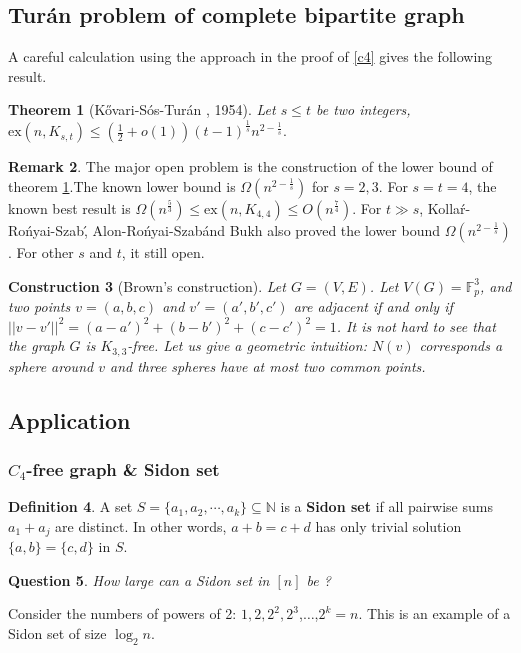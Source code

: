 \documentclass{article}
\newtheorem{theorem}{Theorem}[section]
\newtheorem{question}[theorem]{Question}
\newtheorem{construction}[theorem]{Construction}
\theoremstyle{definition}
\newtheorem{remark}[theorem]{Remark}
\newtheorem{definition}[theorem]{Definition}
\newcommand{\ex}{\mathrm{ex}}
\def\Turan{Tur\'an}
\begin{document}
\subsection{\Turan{} problem of complete bipartite graph}\label{8.2}
A careful calculation using the approach in the proof of  \cref{c4} gives the following result.
   \begin{theorem}[K\H{o}vari-S\'os-\Turan{} \cite{kHovari1954problem}, 1954]\label{kst}
         Let $s\leq t$ be two integers, $\ex(n,K_{s,t})\leq (\frac{1}{2}+o(1))(t-1)^{\frac{1}{s}}n^{2-\frac{1}{s}}.$
    \end{theorem}
\begin{remark}
    The major open problem is the construction of the lower bound of theorem \ref{kst}.The known lower bound is $\Omega(n^{2-\frac{1}{s}})$ for $s=2,3$. For $s=t=4$, the known best result is $\Omega(n^{\frac{5}{3}})\leq \ex(n,K_{4,4})\leq O(n^{\frac{7}{4}}).$ For $t\gg s$, Kolla\'r-Ro\'nyai-Szab\', Alon-Ro\'nyai-Szab\' and Bukh also proved the lower bound $\Omega(n^{2-\frac{1}{s}})$. For other $s$ and $t$, it still open.
\end{remark}
\begin{construction}[Brown's construction]
    Let $G=(V,E)$. Let $V(G)=\mathbb{F}_p^3$, and two points $v=(a,b,c)$ and $v'=(a',b'
    ,c')$ are adjacent if and only if $||v-v'||^2=(a-a')^2+(b-b')^2+(c-c')^2=1$. It is not hard to see that the graph $G$ is $K_{3,3}$-free. Let us give a geometric intuition: $N(v)$ corresponds a sphere around $v$ and three spheres have at most two common points. 
\end{construction}
    



\subsection{Application}\label{8.3}
\subsubsection{$C_4$-free graph \& Sidon set}

\begin{definition}
    A set $S=\{a_1,a_2,\cdots,a_k\}\subseteq \mathbb{N}$ is a \textbf{Sidon set} if all pairwise sums $a_1+a_j$ are distinct. In other words, $a+b=c+d$ has only trivial solution $\{a,b\}=\{c,d\}$ in $S$.
\end{definition}
\begin{question}
    How large can a Sidon set in $[n]$ be ?
\end{question}
Consider the numbers of powers of 2: $1,2,2^2,2^3$,$\dots$,$2^k=n$. This is an example of a Sidon set of size $\log_2 n$. 
\end{document}
